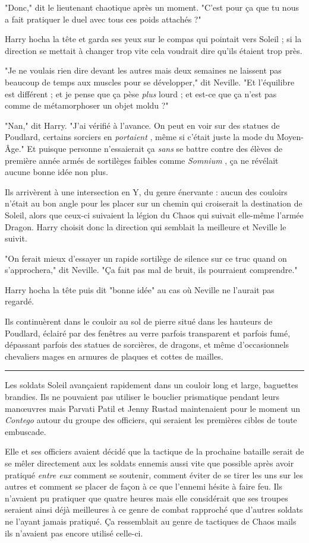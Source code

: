 "Donc," dit le lieutenant chaotique après un moment. "C'est pour ça que tu nous a fait pratiquer le duel avec tous ces poids attachés ?"

Harry hocha la tête et garda ses yeux sur le compas qui pointait vers Soleil ; si la direction se mettait à changer trop vite cela voudrait dire qu'ils étaient trop près.

"Je ne voulais rien dire devant les autres mais deux semaines ne laissent pas beaucoup de temps aux muscles pour se développer," dit Neville. "Et l'équilibre est différent ; et je pense que ça pèse \emph{plus}  lourd ; et est-ce que ça n'est pas comme de métamorphoser un objet moldu ?"

"Nan," dit Harry. "J'ai vérifié à l'avance. On peut en voir sur des statues de Poudlard, certains sorciers en \emph{portaient} , même si c'était juste la mode du Moyen-Âge." Et puisque personne n'essaierait ça \emph{sans } se battre contre des élèves de première année armés de sortilèges faibles comme \emph{Somnium} , ça ne révélait aucune bonne idée non plus.

Ils arrivèrent à une intersection en Y, du genre énervante : aucun des couloirs n'était au bon angle pour les placer sur un chemin qui croiserait la destination de Soleil, alors que ceux-ci suivaient la légion du Chaos qui suivait elle-même l'armée Dragon. Harry choisit donc la direction qui semblait la meilleure et Neville le suivit.

"On ferait mieux d'essayer un rapide sortilège de silence sur ce truc quand on s'approchera," dit Neville. "Ça fait pas mal de bruit, ils pourraient comprendre."

Harry hocha la tête puis dit "bonne idée" au cas où Neville ne l'aurait pas regardé.

Ils continuèrent dans le couloir au sol de pierre situé dans les hauteurs de Poudlard, éclairé par des fenêtres au verre parfois transparent et parfois fumé, dépassant parfois des statues de sorcières, de dragons, et même d'occasionnels chevaliers mages en armures de plaques et cottes de mailles.
\par\noindent\rule{\textwidth}{0.4pt}
Les soldats Soleil avançaient rapidement dans un couloir long et large, baguettes brandies. Ils ne pouvaient pas utiliser le bouclier prismatique pendant leurs manœuvres mais Parvati Patil et Jenny Rustad maintenaient pour le moment un \emph{Contego } autour du groupe des officiers, qui seraient les premières cibles de toute embuscade.

Elle et ses officiers avaient décidé que la tactique de la prochaine bataille serait de se mêler directement aux les soldats ennemis aussi vite que possible après avoir pratiqué \emph{entre eux}  comment se soutenir, comment éviter de se tirer les uns sur les autres et comment se placer de façon à ce que l'ennemi hésite à faire feu. Ils n'avaient pu pratiquer que quatre heures mais elle considérait que ses troupes seraient ainsi déjà meilleures à ce genre de combat rapproché que d'autres soldats ne l'ayant jamais pratiqué. Ça ressemblait au genre de tactiques de Chaos mails ils n'avaient pas encore utilisé celle-ci.


